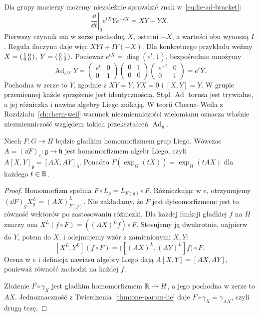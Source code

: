 \begin{przyklad}
\label{prz:ad-matrix-torus}
Dla grupy macierzy możemy niezależnie sprawdzić znak
w~\eqref{eq:lie-ad-bracket}:
\[
 \left.\frac{\dd}{\dd t}\right|_0
 e^{tX}Ye^{-tX}=XY-YX.
\]
Pierwszy czynnik ma w zerze pochodną $X$,
ostatni $-X$, a wartości obu wynoszą $I$.
Reguła iloczynu daje więc $XYI+IY(-X)$.
Dla konkretnego przykładu weźmy
$X=\begin{psmallmatrix}1&0\\0&0\end{psmallmatrix}$,
$Y=\begin{psmallmatrix}0&1\\0&0\end{psmallmatrix}$.
Ponieważ $e^{tX}=\operatorname{diag}(e^t,1)$,
bezpośrednio mnożymy
\[
 \operatorname{Ad}_{e^{tX}}Y
 =\begin{pmatrix}e^t&0\\0&1\end{pmatrix}
  \begin{pmatrix}0&1\\0&0\end{pmatrix}
  \begin{pmatrix}e^{-t}&0\\0&1\end{pmatrix}
 =e^tY.
\]
Pochodna w zerze to $Y$, zgodnie z
$XY=Y$, $YX=0$ i $[X,Y]=Y$.
W grupie przemiennej każde sprzężenie jest identycznością.
Stąd $\operatorname{Ad}$ torusa jest trywialne, a jej
różniczka i nawias algebry Liego znikają.
W teorii Cherna--Weila z Rozdziału~\ref{ch:chern-weil}
warunek niezmienniczości wielomianu oznacza właśnie
niezmienniczość względem takich przekształceń
$\operatorname{Ad}_g$.
\end{przyklad}

\begin{stwierdzenie}
\label{prop:lie-homomorfizm}
Niech $F:G\to H$ będzie gładkim homomorfizmem grup Liego.
Wówczas $A=(\dd F)_e:\mathfrak g\to\mathfrak h$
jest homomorfizmem algebr Liego, czyli
$A[X,Y]_{\mathfrak g}=[AX,AY]_{\mathfrak h}$.
Ponadto $F(\exp_G(tX))=\exp_H(tAX)$ dla każdego $t\in\mathbb{R}$.
\end{stwierdzenie}
\begin{proof}
Homomorfizm spełnia $F\circ L_g=L_{F(g)}\circ F$.
Różniczkując w $e$, otrzymujemy
$(\dd F)_gX^L_g=(AX)^L_{F(g)}$.
Nie zakładamy, że $F$ jest dyfeomorfizmem:
jest to równość wektorów po zastosowaniu różniczki.
Dla każdej funkcji gładkiej $f$ na $H$ znaczy ona
$X^L(f\circ F)=((AX)^Lf)\circ F$.
Stosujemy ją dwukrotnie, najpierw do $Y$, potem do $X$,
i odejmujemy wzór z zamienionymi $X,Y$:
\[
 [X^L,Y^L](f\circ F)
 =\bigl([(AX)^L,(AY)^L]f\bigr)\circ F.
\]
Ocena w $e$ i definicja nawiasu algebry Liego dają
$A[X,Y]=[AX,AY]$, ponieważ równość zachodzi na każdej $f$.

Złożenie $F\circ\gamma_X$ jest gładkim homomorfizmem
$\mathbb{R}\to H$, a jego pochodna w zerze to $AX$.
Jednoznaczność z Twierdzenia~\ref{thm:one-param-lie}
daje $F\circ\gamma_X=\gamma_{AX}$, czyli drugą tezę.
\end{proof}

